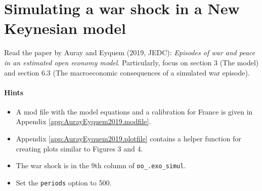 \documentclass{article}
\begin{document}
\newpage

\section{Simulating a war shock in a New Keynesian model}
Read the paper by Auray and Eyquem (2019, JEDC): \emph{Episodes of war and peace in an estimated open economy model}.
Particularly, focus on section 3 (The model) and section 6.3 (The macroeconomic consequences of a simulated war episode).

\paragraph{Hints}
\begin{itemize}
  \item A mod file with the model equations and a calibration for France is given in Appendix \ref{app:AurayEyquem2019.modfile}.
  \item Appendix \ref{app:AurayEyquem2019.plotfile} contains a helper function for creating plots similar to Figures 3 and 4.
  \item The war shock is in the 9th column of \texttt{oo\_.exo\_simul}.
  \item Set the \texttt{periods} option to 500.
\end{itemize}
\end{document}
